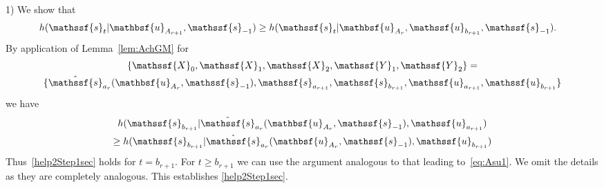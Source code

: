 \documentclass[journal, twocolumn, 10pt]{IEEEtran}
\newcommand{\cN}{{\mathcal{N}}}
\newcommand{\rvX}{{\mathssf{X}}}    %
\newcommand{\rvY}{{\mathssf{Y}}}    %
\newcommand{\rvs}{{\mathssf{s}}}    %
\newcommand{\rvu}{{\mathssf{u}}}    %
\newcommand{\rvbu}{{\mathbsf{u}}}
\newcommand{\rvw}{{\mathssf{w}}}    %
\begin{document}
{1) We show that 
\begin{align}
&h(\rvs_{t}| \rvbu_{A_{r+1}}, \rvs_{-1}) \ge h(\rvs_{t}| \rvbu_{A_{r}}, \rvu_{b_{r+1}}, \rvs_{-1})\label{help2Step1sec}.
\end{align} By application of Lemma~\ref{lem:AchGM} for \begin{multline}\{\rvX_{0}, \rvX_{1}, \rvX_{2}, \rvY_1, \rvY_2\}= \\ \{\hat{\rvs}_{a_{r}}(\rvbu_{A_{r}}, \rvs_{-1}), \rvs_{a_{r+1}}, \rvs_{b_{r+1}}, \rvu_{a_{r+1}}, \rvu_{b_{r+1}}\}\end{multline} we have 
\begin{multline}
h(\rvs_{b_{r+1}}| \hat{\rvs}_{a_{r}}(\rvbu_{A_{r}}, \rvs_{-1}), \rvu_{a_{r+1}})  \\ \ge h(\rvs_{b_{r+1}}| \hat{\rvs}_{a_{r}}(\rvbu_{A_{r}}, \rvs_{-1}), \rvu_{b_{r+1}}) \label{eq:ju1}
\end{multline} 
Thus~\eqref{help2Step1sec} holds for $t=b_{r+1}$. For $t \ge b_{r+1}$ we can use the argument analogous to that leading to~\eqref{eq:Asu1}. We omit the details as they are completely analogous. This establishes \eqref{help2Step1sec}.

}
\end{document}
